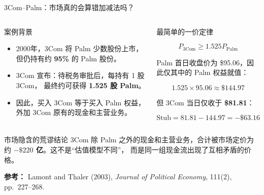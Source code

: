 \documentclass[UTF8,aspectratio=169,11pt]{ctexbeamer}
\begin{document}
\begin{frame}{3Com--Palm：市场真的会算错加减法吗？}
\small

\begin{columns}[T,totalwidth=\textwidth]

\begin{casebox}{案例背景}
\scriptsize
\begin{itemize}
\item 2000年，3Com 将 Palm 少数股份上市，但仍持有约
      \textbf{95\%} 的 Palm 股份。
\item 3Com 宣布：待税务审批后，每持有 1 股 3Com，
      最终约可获得 \textbf{1.525 股 Palm}。
\item 因此，买入 3Com 等于买入 Palm 权益，
      外加 3Com 原有的现金和主营业务。
\end{itemize}
\end{casebox}

\begin{keybox}{最简单的一价定律}
\scriptsize

\[
P_{\mathrm{3Com}}
\geq
1.525P_{\mathrm{Palm}}
\]

Palm 首日收盘价为 \$95.06，因此仅其中的 Palm 权益就值：

\[
1.525\times95.06
\approx
\$144.97
\]

但 3Com 当日仅收于 \textbf{\$81.81}：

\[
\text{Stub}
=
81.81-144.97
=
\boxed{-\$63.16}
\]

\end{keybox}

\end{columns}

\vspace{0.12cm}

\begin{riskbox}{市场隐含的荒谬结论}
\scriptsize
3Com 除 Palm 之外的现金和主营业务，合计被市场定价为约
\textbf{$-\$220$ 亿}。这不是“估值模型不同”，
而是同一组现金流出现了互相矛盾的价格。
\end{riskbox}

\vspace{0.04cm}
{\tiny\color{aqgray}
\textbf{参考：}
Lamont and Thaler (2003),
\emph{Journal of Political Economy},
111(2), pp.~227--268.
}

\end{frame}
\end{document}
